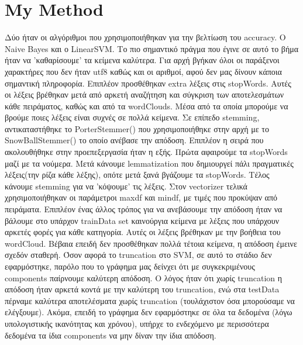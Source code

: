 \documentclass[a4paper,12pt]{article}
\begin{document}
    \section*{My Method}
        Δύο ήταν οι αλγόριθμοι που χρησιμοποιήθηκαν για την βελτίωση του accuracy. Ο Naive Bayes και ο LinearSVM.
        Το πιο σημαντικό πράγμα που έγινε σε αυτό το βήμα ήταν να 'καθαρίσουμε' τα κείμενα καλύτερα. Για αρχή
        βγήκαν όλοι οι παράξενοι χαρακτήρες που δεν ήταν utf8 καθώς και οι αριθμοί, αφού δεν μας δίνουν κάποια
        σημαντική πληροφορία. Επιπλέον προσθέθηκαν extra λέξεις στις stopWords. Αυτές οι λέξεις βρέθηκαν μετά από
        αρκετή αναζήτηση και σύγκριση των αποτελεσμάτων κάθε πειράματος, καθώς και από τα wordClouds. Μέσα από τα
        οποία μπορούμε να βρούμε ποιες λέξεις είναι συχνές σε πολλά κείμενα. Σε επίπεδο stemming, αντικαταστήθηκε
        το PorterStemmer() που χρησιμοποιήθηκε στην αρχή με το SnowBallStemmer() το οποίο ανέβασε την απόδοση. 
        Επιπλέον η σειρά που ακολουθήθηκε στην προεπεξεργασία ήταν η εξής. Πρώτα αφαιρούμε τα stopWords μαζί με τα
        νούμερα. Μετά κάνουμε lemmatization που δημιουργεί πάλι πραγματικές λέξεις(την ρίζα κάθε λέξης), οπότε μετά
        ξανά βγάζουμε τα stopWords. Τέλος κάνουμε stemming για να 'κόψουμε' τις λέξεις. Στον vectorizer τελικά
        χρησιμοποιήθηκαν οι παράμετροι max\textunderscore df και min\textunderscore df, με τιμές που προκύψαν από
        πειράματα. Επιπλέον ένας άλλος τρόπος για να ανεβάσουμε την απόδοση ήταν να βάλουμε στο υπάρχον trainData set
        καινούργια κείμενα με λέξεις που υπάρχουν αρκετές φορές για κάθε κατηγορία. Αυτές οι λέξεις βρέθηκαν με την
        βοήθεια του wordCloud. Βέβαια επειδή δεν προσθέθηκαν πολλά τέτοια κείμενα, η απόδοση έμεινε σχεδόν σταθερή.
        Όσον αφορά το truncation στο SVM, σε αυτό το στάδιο δεν εφαρμόστηκε, παρόλο που το γράφημα μας δείνχει
        ότι με συγκεκριμένους components παίρνουμε καλύτερη απόδοση. Ο λόγος ήταν ότι χωρίς truncation η απόδοση
        ήταν αρκετά κοντά με την καλύτερη του truncation, ενώ στα testData πέρναμε καλύτερα αποτελέσματα χωρίς truncation
        (τουλάχιστον όσα μπορούσαμε να ελέγξουμε). Ακόμα, επειδή το γράφημα δεν εφαρμόστηκε σε όλα τα δεδομένα
        (λόγω υπολογιστικής ικανότητας και χρόνου), υπήρχε το ενδεχόμενο με περισσότερα δεδομένα τα ίδια components
        να μην δίναν την ίδια απόδοση.
\end{document}
